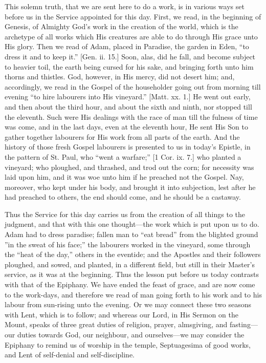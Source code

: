 This solemn truth, that we are sent here to do a work, is in
various ways set before us in the Service appointed for this day.
First, we read, in the beginning of Genesis, of Almighty God's work in
the creation of the world, which is the archetype of all works which
His creatures are able to do through His grace unto His glory. Then we
read of Adam, placed in Paradise, the garden in Eden, ``to dress
it and to keep it.'' [Gen. ii. 15.] Soon, alas, did he fall, and
become subject to heavier toil, the earth being cursed for his sake,
and bringing forth unto him thorns and thistles. God, however, in His
mercy, did not desert him; and, accordingly, we read in the Gospel of
the householder going out from morning till evening ``to hire
labourers into His vineyard.'' [Matt. xx. 1.] He went out early,
and then about the third hour, and about the sixth and ninth, nor
stopped till the eleventh. Such were His dealings with the race of man
till the fulness of time was come, and in the last days, even at the
eleventh hour, He sent His Son to gather together labourers for His
work from all parts of the earth. And the history of those fresh
Gospel labourers is presented to us in today's Epistle, in the pattern
of St. Paul, who ``went a warfare;'' [1 Cor. ix. 7.] who
planted a vineyard; who ploughed, and thrashed, and trod out the corn;
for necessity was laid upon him, and it was woe unto him if he
preached not the Gospel. Nay, moreover, who kept under his body, and
brought it into subjection, lest after he had preached to others, the
end should come, and he should be a castaway.

Thus the Service for this day carries us from the creation of all
things to the judgment, and that with this one thought—the work
which is put upon us to do. Adam had to dress paradise; fallen man to
``eat bread'' from the blighted ground ''in the sweat of his
face;'' the labourers worked in the vineyard, some through the
``heat of the day,'' others in the eventide; and the Apostles
and their followers ploughed, and sowed, and planted, in a different
field, but still in their Master's service, as it was at the
beginning. Thus the lesson put before us today contrasts with that of
the Epiphany. We have ended the feast of grace, and are now come to
the work-days, and therefore we read of man going forth to his work
and to his labour from sun-rising unto the evening. Or we may connect
these two seasons with Lent, which is to follow; and whereas our Lord,
in His Sermon on the Mount, speaks of three great duties of religion,
prayer, almsgiving, and fasting—our duties towards God, our
neighbour, and ourselves—we may consider the Epiphany to remind us
of worship in the temple, Septuagesima of good works, and Lent of
self-denial and self-discipline.

